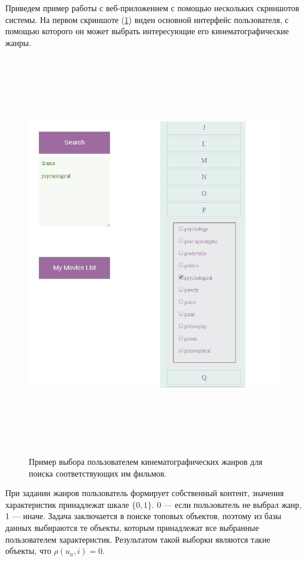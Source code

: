 Приведем пример работы с веб-приложением с помощью нескольких скриншотов системы.
На первом скриншоте (\ref{pic:ml-screen1}) виден основной интерфейс пользователя, с помощью которого
он может выбрать интересующие его кинематографические жанры.
\begin{figure}
	\label{pic:ml-screen1}
\caption{Пример выбора пользователем кинематографических жанров для поиска соответствующих им фильмов.}
\begin{center}
  \includegraphics[width=7in,height=7in]{pics/ml-interface.png}
\end{center}
\end{figure}

При задании жанров пользователь формирует собственный контент, значения характеристик принадлежат шкале $\{0,1\}$.
0 --- если пользователь не выбрал жанр, 1 --- иначе. Задача заключается в поиске топовых объектов, поэтому
из базы данных выбираются те объекты, которым принадлежат все выбранные
пользователем характеристик. Результатом
такой выборки являются такие объекты, что $\rho(u_a, i) = 0$.

